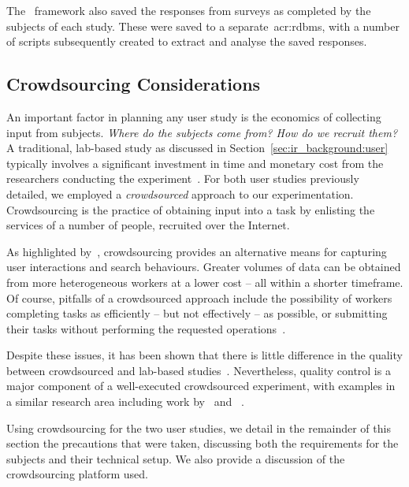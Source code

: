 The \treconomics~framework also saved the responses from surveys as completed by the subjects of each study. These were saved to a separate~\gls{acr:rdbms}, with a number of scripts subsequently created to extract and analyse the saved responses.

\subsection{Crowdsourcing Considerations}\label{sec:methodology:user:crowdsourcing}
An important factor in planning any user study is the economics of collecting input from subjects. \emph{Where do the subjects come from? How do we recruit them?} A traditional, lab-based study as discussed in Section~\ref{sec:ir_background:user} typically involves a significant investment in time and monetary cost from the researchers conducting the experiment~\citep{spool2001testing}. For both user studies previously detailed, we employed a \emph{crowdsourced} approach to our experimentation. Crowdsourcing is the practice of obtaining input into a task by enlisting the services of a number of people, recruited over the Internet.

As highlighted by~\cite{zuccon2013crowdsourcing_comparisons}, crowdsourcing provides an alternative means for capturing user interactions and search behaviours. Greater volumes of data can be obtained from more heterogeneous workers at a lower cost -- all within a shorter timeframe. Of course, pitfalls of a crowdsourced approach include the possibility of workers completing tasks as efficiently -- but not effectively -- as possible, or submitting their tasks without performing the requested operations~\citep{feild2010turkers}.

Despite these issues, it has been shown that there is little difference in the quality between crowdsourced and lab-based studies~\citep{kely2011user_study, zuccon2013crowdsourcing_comparisons}. Nevertheless, quality control is a major component of a well-executed crowdsourced experiment, with examples in a similar research area including work by~\cite{kazai2011crowdsourced} and ~\cite{crescenzi2013crowdsourced}.

Using crowdsourcing for the two user studies, we detail in the remainder of this section the precautions that were taken, discussing both the requirements for the subjects and their technical setup. We also provide a discussion of the crowdsourcing platform used.

